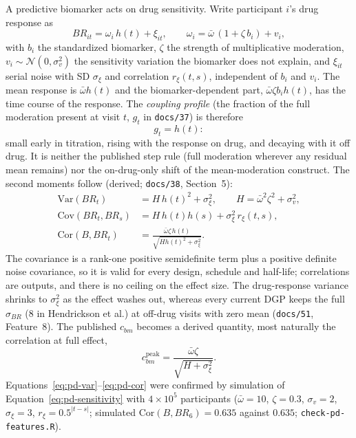\documentclass[11pt]{article}
\newcommand{\code}[1]{\texttt{#1}}
\begin{document}
A predictive biomarker acts on drug sensitivity. Write participant
$i$'s drug response as
\begin{equation}
BR_{it} = \omega_i\, h(t) + \xi_{it}, \qquad
\omega_i = \bar\omega\,(1 + \zeta\, b_i) + v_i,
\label{eq:pd-sensitivity}
\end{equation}
with $b_i$ the standardized biomarker, $\zeta$ the strength of
multiplicative moderation, $v_i \sim \mathcal N(0, \sigma_v^2)$ the sensitivity
variation the biomarker does not explain, and $\xi_{it}$ serial noise
with SD $\sigma_\xi$ and correlation $r_\xi(t,s)$, independent of $b_i$
and $v_i$. The mean response is $\bar\omega h(t)$ and the
biomarker-dependent part, $\bar\omega\zeta b_i h(t)$, has the time
course of the response. The \emph{coupling profile} (the fraction of
the full moderation present at visit $t$, $g_t$ in \code{docs/37}) is
therefore
\begin{equation}
g_t = h(t):
\label{eq:pd-profile}
\end{equation}
small early in titration, rising with the response on drug, and
decaying with it off drug. It is neither the published step rule
(full moderation wherever any residual mean remains) nor the
on-drug-only shift of the mean-moderation construct. The second
moments follow (derived; \code{docs/38}, Section~5):
\begin{align}
\mathrm{Var}(BR_t) &= H\, h(t)^2 + \sigma_\xi^2, \qquad
  H = \bar\omega^2\zeta^2 + \sigma_v^2, \label{eq:pd-var}\\
\mathrm{Cov}(BR_t, BR_s) &= H\, h(t) h(s) + \sigma_\xi^2\, r_\xi(t,s),
  \label{eq:pd-cov}\\
\mathrm{Cor}(B, BR_t) &= \frac{\bar\omega\zeta\, h(t)}
  {\sqrt{H h(t)^2 + \sigma_\xi^2}} . \label{eq:pd-cor}
\end{align}
The covariance is a rank-one positive semidefinite term plus a
positive definite noise covariance, so it is valid for every design,
schedule and half-life; correlations are outputs, and there is no
ceiling on the effect size. The drug-response variance shrinks to
$\sigma_\xi^2$ as the effect washes out, whereas every current DGP
keeps the full $\sigma_{BR}$ (8 in Hendrickson et al.) at off-drug
visits with zero mean (\code{docs/51}, Feature~8). The published
$c_{bm}$ becomes a derived quantity, most naturally the correlation at
full effect,
\begin{equation}
c_{bm}^{\text{peak}} = \frac{\bar\omega\zeta}
  {\sqrt{H + \sigma_\xi^2}} .
\label{eq:pd-cpeak}
\end{equation}
Equations~\eqref{eq:pd-var}--\eqref{eq:pd-cor} were confirmed by
simulation of Equation~\eqref{eq:pd-sensitivity} with $4\times10^5$
participants ($\bar\omega = 10$, $\zeta = 0.3$, $\sigma_v = 2$,
$\sigma_\xi = 3$, $r_\xi = 0.5^{|t-s|}$; simulated
$\mathrm{Cor}(B, BR_6) = 0.635$ against $0.635$;
\code{check-pd-features.R}).
\end{document}
